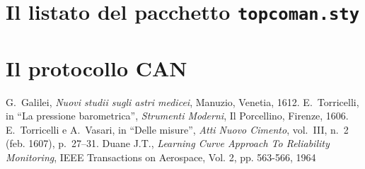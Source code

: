 \documentclass[12pt,twoside,cucitura]{toptesi}
\begin{document}
\chapter{Il listato del pacchetto \texttt{topcoman.sty}}

\appendix
\chapter{Il protocollo CAN}


\begin{thebibliography}{9}
 G.~Galilei, {\em Nuovi studii sugli astri medicei}, Manuzio,
        Venetia, 1612.
 E.~Torricelli, in ``La pressione barometrica'', {\em Strumenti
        Moderni}, Il Porcellino, Firenze, 1606.
 E.~Torricelli e A.~Vasari, in ``Delle misure'', {\em Atti Nuovo
        Cimento}, vol.~III, n.~2 (feb. 1607), p.~27--31.
 Duane J.T., \emph{Learning Curve Approach To Reliability 
		Monitoring}, IEEE Transactions on Aerospace, Vol. 2, pp. 563-566, 1964
\end{thebibliography}
\end{document}
